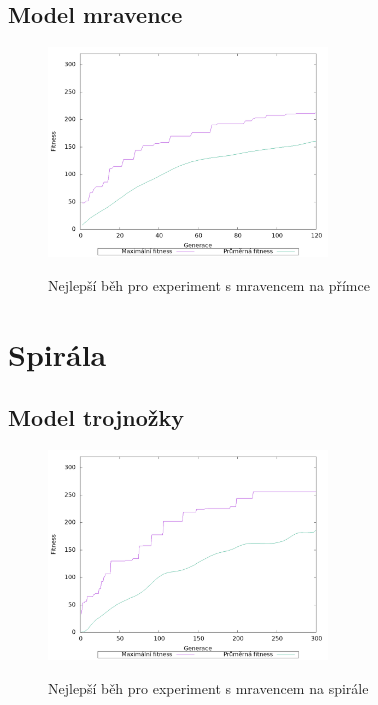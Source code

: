 \subsection{Model mravence}

\begin{figure}[h]
    \centering
    {\includegraphics[width=20em]{obrazky/mravenec_primka_fitness_prubeh.png}}
    \caption{
    Nejlepší běh pro experiment s mravencem na přímce
    }
    \label{fig:mravenec_primka_fitness_prubeh}
\end{figure}



\section{Spirála}

\subsection{Model trojnožky}
\begin{figure}[h]
    \centering
    {\includegraphics[width=20em]{obrazky/trojnozka_spirala_fitness_prubeh.png}}
    \caption{
    Nejlepší běh pro experiment s mravencem na spirále
    }
    \label{fig:trojnozka_spirala_fitness_prubeh}
\end{figure}

